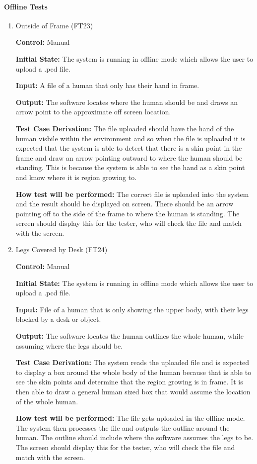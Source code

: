 \documentclass[12pt, titlepage]{article}
\begin{document}
\paragraph{Offline Tests}
\begin{enumerate}
  \item{Outside of Frame (FT23)\label{FT23}\\}
  
  \textbf{Control:} Manual

  \textbf{Initial State:} The system is running in offline mode which allows the user to upload a .pcd file.
  
  \textbf{Input:}  A file of a human that only has their hand in frame. 

  \textbf{Output:} The software locates where the human should be and draws an arrow point to the approximate off screen location.
  
  \textbf{Test Case Derivation:} The file uploaded should have the hand of the human visbile within the environment and so when the file is uploaded it is expected that the system is able to detect that there is a skin point in the frame and draw an arrow pointing outward to where the human should be standing. This is because the system is able to see the hand as a skin point and know where it is region growing to.
  
  \textbf{How test will be performed:} The correct file is uploaded into the system and the result should be displayed on screen. There should be an arrow pointing off to the side of the frame to where the human is standing. The screen should display this for the tester, who will check the file and match with the screen.
  
  \item{Legs Covered by Desk (FT24)\label{FT24}\\}

  \textbf{Control:} Manual

  \textbf{Initial State:} The system is running in offline mode which allows the user to upload a .pcd file.

  \textbf{Input:} File of a human that is only showing the upper body, with their legs blocked by a desk or object.

  \textbf{Output:} The software locates the human outlines the whole human, while assuming where the legs should be. 
  
  \textbf{Test Case Derivation:} The system reads the uploaded file and is expected to display a box around the whole body of the human because that is able to see the skin points and determine that the region growing is in frame. It is then able to draw a general human sized box that would assume the location of the whole human.

  \textbf{How test will be performed:} The file gets uploaded in the offline mode. The system then processes the file and outputs the outline around the human. The outline should include where the software assumes the legs to be. The screen should display this for the tester, who will check the file and match with the screen.
  
\end{enumerate}
\end{document}
